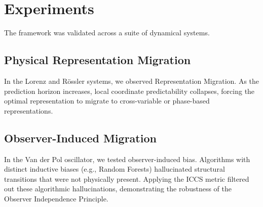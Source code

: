 \section{Experiments}
The framework was validated across a suite of dynamical systems.

\subsection{Physical Representation Migration}
In the Lorenz and Rössler systems, we observed Representation Migration. As the prediction horizon increases, local coordinate predictability collapses, forcing the optimal representation to migrate to cross-variable or phase-based representations.

\subsection{Observer-Induced Migration}
In the Van der Pol oscillator, we tested observer-induced bias. Algorithms with distinct inductive biases (e.g., Random Forests) hallucinated structural transitions that were not physically present. Applying the ICCS metric filtered out these algorithmic hallucinations, demonstrating the robustness of the Observer Independence Principle.
